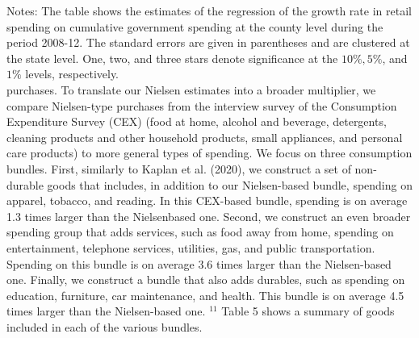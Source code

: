 \documentclass[10pt]{article}
\begin{document}
Notes: The table shows the estimates of the regression of the growth rate in retail spending on cumulative government spending at the county level during the period 2008-12. The standard errors are given in parentheses and are clustered at the state level. One, two, and three stars denote significance at the $10 \%, 5 \%$, and $1 \%$ levels, respectively.\\
purchases. To translate our Nielsen estimates into a broader multiplier, we compare Nielsen-type purchases from the interview survey of the Consumption Expenditure Survey (CEX) (food at home, alcohol and beverage, detergents, cleaning products and other household products, small appliances, and personal care products) to more general types of spending. We focus on three consumption bundles. First, similarly to Kaplan et al. (2020), we construct a set of non-durable goods that includes, in addition to our Nielsen-based bundle, spending on apparel, tobacco, and reading. In this CEX-based bundle, spending is on average 1.3 times larger than the Nielsenbased one. Second, we construct an even broader spending group that adds services, such as food away from home, spending on entertainment, telephone services, utilities, gas, and public transportation. Spending on this bundle is on average 3.6 times larger than the Nielsen-based one. Finally, we construct a bundle that also adds durables, such as spending on education, furniture, car maintenance, and health. This bundle is on average 4.5 times larger than the Nielsen-based one. ${ }^{11}$ Table 5 shows a summary of goods included in each of the various bundles.
\end{document}
